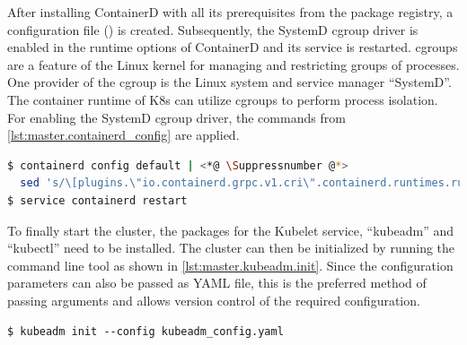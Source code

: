 After installing ContainerD with all its prerequisites from the package registry, a configuration file () is created.
Subsequently, the SystemD \ac{cgroup} driver is enabled in the runtime options of ContainerD and its service is restarted.
\acp{cgroup} are a feature of the Linux kernel for managing and restricting groups of processes\cite{ArchWiki.20230316}. One provider of the \ac{cgroup} is the Linux system and service manager \enquote{SystemD}. The container runtime of \ac{K8s} can utilize \acp{cgroup} to perform process isolation.
For enabling the SystemD \ac{cgroup} driver, the commands from \autoref{lst:master.containerd_config} are applied.
\vspace{1em}
\begin{lstlisting}[label=lst:master.containerd_config, caption={Bash command for setting up containerd config},language=bash, morekeywords={sudo, kubeadm, tee, service}]
$ containerd config default | <*@ \Suppressnumber @*>
  sed 's/\[plugins.\"io.containerd.grpc.v1.cri\".containerd.runtimes.runc.options\]/&\n SystemdCgroup = true/' | tee /etc/containerd/config.toml >/dev/null <*@ \Reactivatenumber @*>
$ service containerd restart
\end{lstlisting}

To finally start the cluster, the packages for the Kubelet service, \enquote{kubeadm} and \enquote{kubectl} need to be installed. The cluster can then be initialized by running the command line tool as shown in \autoref{lst:master.kubeadm.init}. Since the configuration parameters can also be passed as YAML file, this is the preferred method of passing arguments and allows version control of the required configuration.
\begin{lstlisting}[label=lst:master.kubeadm.init, caption={Bash command for setting up the cluster}, morekeywords={sudo, kubeadm}, numbers=none]
$ kubeadm init --config kubeadm_config.yaml
\end{lstlisting}

